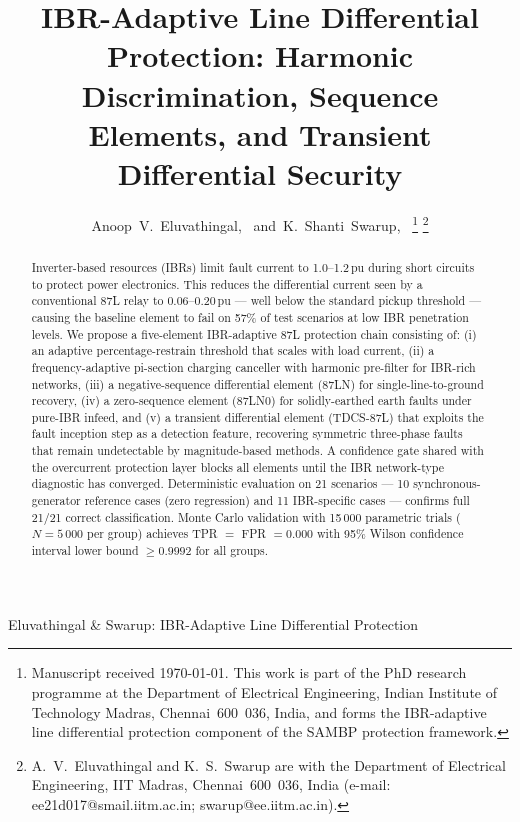 \documentclass[journal,twoside,10pt]{IEEEtran}
\begin{document}

\title{IBR-Adaptive Line Differential Protection: Harmonic Discrimination,
       Sequence Elements, and Transient Differential Security}

\author{Anoop~V.~Eluvathingal,~
        and~K.~Shanti~Swarup,~%
\thanks{Manuscript received \today.
        This work is part of the PhD research programme at the Department of
        Electrical Engineering, Indian Institute of Technology Madras,
        Chennai~600~036, India, and forms the IBR-adaptive line differential
        protection component of the SAMBP protection framework.}%
\thanks{A.~V.~Eluvathingal and K.~S.~Swarup are with the Department of
        Electrical Engineering, IIT Madras, Chennai~600~036, India
        (e-mail: ee21d017@smail.iitm.ac.in; swarup@ee.iitm.ac.in).}}

%
{Eluvathingal \& Swarup: IBR-Adaptive Line Differential Protection}

\maketitle

\begin{abstract}
Inverter-based resources (IBRs) limit fault current to 1.0--1.2\,pu during
short circuits to protect power electronics.  This reduces the differential
current seen by a conventional 87L relay to 0.06--0.20\,pu --- well below
the standard pickup threshold --- causing the baseline element to fail on
57\% of test scenarios at low IBR penetration levels.
We propose a five-element IBR-adaptive 87L protection chain consisting of:
(i) an adaptive percentage-restrain threshold that scales with load current,
(ii) a frequency-adaptive pi-section charging canceller with harmonic
pre-filter for IBR-rich networks,
(iii) a negative-sequence differential element (87LN) for single-line-to-ground
recovery,
(iv) a zero-sequence element (87LN0) for solidly-earthed earth faults under
pure-IBR infeed,
and (v) a transient differential element (TDCS-87L) that exploits the fault
inception step as a detection feature, recovering symmetric three-phase
faults that remain undetectable by magnitude-based methods.
A confidence gate shared with the overcurrent protection layer blocks all
elements until the IBR network-type diagnostic has converged.
Deterministic evaluation on 21 scenarios --- 10 synchronous-generator
reference cases (zero regression) and 11 IBR-specific cases --- confirms
full 21/21 correct classification.
Monte Carlo validation with 15\,000 parametric trials ($N=5\,000$ per
group) achieves TPR $=$ FPR $= 0.000$ with 95\% Wilson confidence
interval lower bound $\geq 0.9992$ for all groups.
\end{abstract}
\end{document}
